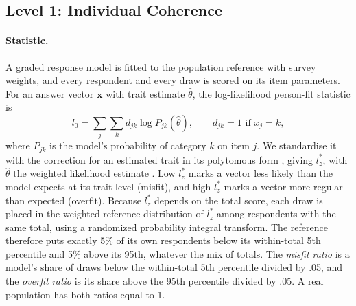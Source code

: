 \subsection*{Level 1: Individual Coherence}
\label{sec:s7-l1}

\paragraph{Statistic.}
A graded response model \citep{samejima1969graded} is fitted to the population reference with survey weights, and every respondent and every draw is scored on its item parameters.
For an answer vector $\mathbf{x}$ with trait estimate $\hat\theta$, the log-likelihood person-fit statistic \citep{drasgow1985appropriateness} is
\begin{equation}
l_0 = \sum_{j} \sum_{k} d_{jk} \log P_{jk}(\hat\theta), \qquad d_{jk} = 1 \text{ if } x_j = k,
\end{equation}
where $P_{jk}$ is the model's probability of category $k$ on item $j$.
We standardise it with the correction for an estimated trait \citep{snijders2001personfit} in its polytomous form \citep{sinharay2016personfit}, giving $l_z^*$, with $\hat\theta$ the weighted likelihood estimate \citep{warm1989wle}.
Low $l_z^*$ marks a vector less likely than the model expects at its trait level (misfit), and high $l_z^*$ marks a vector more regular than expected (overfit).
Because $l_z^*$ depends on the total score, each draw is placed in the weighted reference distribution of $l_z^*$ among respondents with the same total, using a randomized probability integral transform.
The reference therefore puts exactly 5\% of its own respondents below its within-total 5th percentile and 5\% above its 95th, whatever the mix of totals.
The \emph{misfit ratio} is a model's share of draws below the within-total 5th percentile divided by .05, and the \emph{overfit ratio} is its share above the 95th percentile divided by .05.
A real population has both ratios equal to 1.

